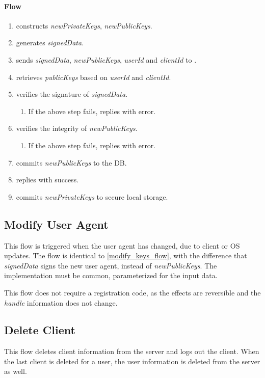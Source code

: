 \documentclass[a4paper,10pt]{article}
\newcommand{\signedData}{\emph{signedData}}
\newcommand{\newPublicKeys}{\emph{newPublicKeys}}
\newcommand{\newPrivateKeys}{\emph{newPrivateKeys}}
\newcommand{\handle}{\emph{handle}}
\newcommand{\publicKeys}{\emph{publicKeys}}
\newcommand{\userId}{\emph{userId}}
\newcommand{\clientId}{\emph{clientId}}
\begin{document}
\paragraph{Flow}

\begin{enumerate}
 \item \Client{} constructs \newPrivateKeys{}, \newPublicKeys{}.
 \item \Client{} generates \signedData{}.
 \item \Client{} sends \signedData{}, \newPublicKeys{}, \userId{} and \clientId{} to \Server{}.
 \item \Server{} retrieves \publicKeys{} based on \userId{} and \clientId{}.
 \item \Server{} verifies the signature of \signedData{}.
 \begin{enumerate}
  \item If the above step fails, \Server{} replies with error.
 \end{enumerate}
 \item \Server{} verifies the integrity of \newPublicKeys{}.
 \begin{enumerate}
  \item If the above step fails, \Server{} replies with error.
 \end{enumerate}
 \item \Server{} commits \newPublicKeys{} to the DB.
 \item \Server{} replies with success.
 \item\label{modify_keys_flow:local_storage} \Client{} commits \newPrivateKeys{} to secure local storage.
\end{enumerate}

\subsection{Modify User Agent}
\label{modify_user_agent_flow}
This flow is triggered when the user agent has changed, due to client or OS updates. The flow is identical to \ref{modify_keys_flow}, with the difference that \signedData{} 
signs the new user agent, instead of \newPublicKeys{}. The implementation must be common, parameterized for the input data.

This flow does not require a registration code, as the effects are reversible and the \handle{} information does not change.

\subsection{Delete Client}
This flow deletes client information from the server and logs out the client. 
When the last client is deleted for a user, the user information is deleted 
from the server as well.
\end{document}
